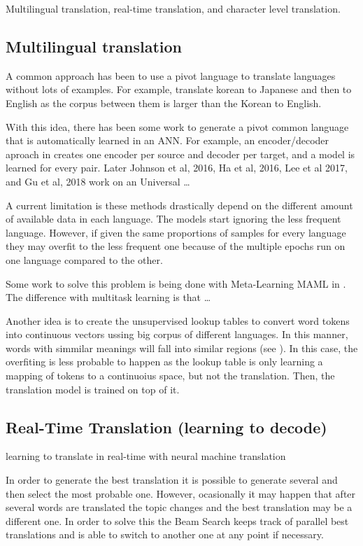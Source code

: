 \documentclass[b5paper]{report}
\begin{document}
Multilingual translation, real-time translation, and character level
translation.

\subsection{Multilingual translation}

A common approach has been to use a pivot language to translate languages
without lots of examples. For example, translate korean to Japanese and then to
English as the corpus between them is larger than the Korean to English.

With this idea, there has been some work to generate a pivot common language
that is automatically learned in an \gls{ANN}. For example, an encoder/decoder
aproach in \cite{firat2016multi, firat2016zero} creates one encoder per source
and decoder per target, and a model is learned for every pair. Later Johnson et
al, 2016, Ha et al, 2016, Lee et al 2017, and Gu et al, 2018 work on an
Universal \dots

A current limitation is these methods drastically depend on the different
amount of available data in each language. The models start ignoring the less
frequent language. However, if given the same proportions of samples for every
language they may overfit to the less frequent one because of the multiple epochs
run on one language compared to the other.

Some work to solve this problem is being done with Meta-Learning MAML in
\cite{finn2017model}. The difference with multitask learning is that  \dots

Another idea is to create the unsupervised lookup tables to convert word tokens
into continuous vectors ussing big corpus of different languages. In this
manner, words with simmilar meanings will fall into similar regions (see
\cite{artetxe2017unsupervised}). In this case, the overfiting is less probable
to happen as the lookup table is only learning a mapping of tokens to a
continuoius space, but not the translation. Then, the translation model is
trained on top of it.

\subsection{Real-Time Translation (learning to decode)}

learning to translate in real-time with neural machine translation
\cite{gu2016learning}

In order to generate the best translation it is possible to generate several
and then select the most probable one. However, ocasionally it may happen that
after several words are translated the topic changes and the best translation
may be a different one. In order to solve this the Beam Search keeps track of
parallel best translations and is able to switch to another one at any point if
necessary.
\end{document}
